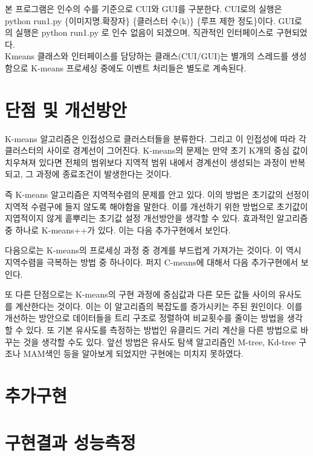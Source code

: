 \documentclass{oblivoir}
\begin{document}
본 프로그램은 인수의 수를 기준으로 CUI와 GUI를 구분한다. CUI로의 실행은 python run1.py \{이미지명.확장자\} \{클러스터 수(k)\} \{루프 제한 정도\}이다. GUI로의 실행은 python run1.py 로 인수 없음이 되겠으며, 직관적인 인터페이스로 구현되었다.\\
Kmeans 클래스와 인터페이스를 담당하는 클래스(CUI/GUI)는 별개의 스레드를 생성함으로 K-means 프로세싱 중에도 이벤트 처리들은 별도로 계속된다.




\section{단점 및 개선방안 \label{ss:add}}
K-means 알고리즘은 인접성으로 클러스터들을 분류한다. 그리고 이 인접성에 따라 각 클러스터의 사이로 경계선이 그어진다. K-means의 문제는 만약 초기 K개의 중심 값이 치우쳐져 있다면 전체의 범위보다 지역적 범위 내에서 경계선이 생성되는 과정이 반복되고, 그 과정에 종료조건이 발생한다는 것이다.
\newline


즉 K-means 알고리즘은 지역적수렴의 문제를 안고 있다. 이의 방법은 초기값의 선정이 지역적 수렴구에 들지 않도록 해야함을 말한다. 이를 개선하기 위한 방법으로 초기값이 지엽적이지 않게 흩뿌리는 초기값 설정 개선방안을 생각할 수 있다. 효과적인 알고리즘 중 하나로 K-means++가 있다. 이는 다음 추가구현에서 보인다. 
\newline

다음으로는 K-means의 프로세싱 과정 중 경계를 부드럽게 가져가는 것이다. 이 역시 지역수렴을 극복하는 방법 중 하나이다. 퍼지 C-means에 대해서 다음 추가구현에서 보인다.
\newline

또 다른 단점으로는 K-means의 구현 과정에 중심값과 다른 모든 값들 사이의 유사도를 계산한다는 것이다. 이는 이 알고리즘의 복잡도를 증가시키는 주된 원인이다. 이를 개선하는 방안으로 데이터들을 트리 구조로 정렬하여 비교횟수를 줄이는 방법을 생각할 수 있다. 또 기본 유사도를 측정하는 방법인 유클리드 거리 계산을 다른 방법으로 바꾸는 것을 생각할 수도 있다. 앞선 방법은 유사도 탐색 알고리즘인 M-tree, Kd-tree 구조나 MAM색인 등을 알아보게 되었지만 구현에는 미치지 못하였다.


\section{추가구현 \label{ss:add}}

\section{구현결과 성능측정 \label{ss:add}}
\end{document}
